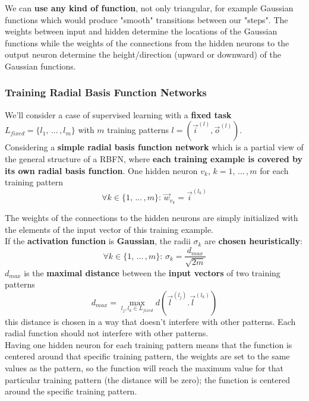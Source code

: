 We can \textbf{use any kind of function}, not only triangular, for example Gaussian functions which would produce "smooth" transitions between our "steps". The weights between input and hidden determine the locations of the Gaussian functions while the weights of the connections from the hidden neurons to the output neuron determine the height/direction (upward or downward) of the Gaussian functions.


\newpage

\subsubsection{Training Radial Basis Function Networks}
We'll consider a case of supervised learning with a \textbf{fixed task} $L_{fixed} = \{l_1, \, ... \, , l_m\}$ with $m$ training patterns $l = \left(\vec{i}^{(l)}, \vec{o}^{(l)}\right)$.\\

Considering a \textbf{simple radial basis function network} which is a partial view of the general structure of a RBFN, where \textbf{each training example is covered by its own radial basis function}. One hidden neuron $v_k$, $k = 1, \, ... \, , m$ for each training pattern
$$ \forall k \in \{1, \, ... \, , m\}: \, \vec{w}_{v_k} = \vec{i}^{(l_k)} $$

The weights of the connections to the hidden neurons are simply initialized with the elements of the input vector of this training example.\\

If the \textbf{activation function} is \textbf{Gaussian}, the radii $\sigma_k$ are \textbf{chosen heuristically}:
$$ \forall k \in \{1, \, ... \, , m\}: \, \sigma_k = \frac{d_{max}}{\sqrt{2m}} $$
$d_{max}$ is the \textbf{maximal distance} between the \textbf{input vectors} of two training patterns
$$ d_{max} = \max_{l_j, l_k \in L_{fixed}} d\left(\vec{l}^{(l_j)}. \vec{l}^{(l_k)}\right)$$
this distance is chosen in a way that doesn't interfere with other patterns. Each radial function should not interfere with other patterns.\\

Having one hidden neuron for each training pattern means that the function is centered around that specific training pattern, the weights are set to the same values as the pattern, so the function will reach the maximum value for that particular training pattern (the distance will be zero); the function is centered around the specific training pattern. \\

